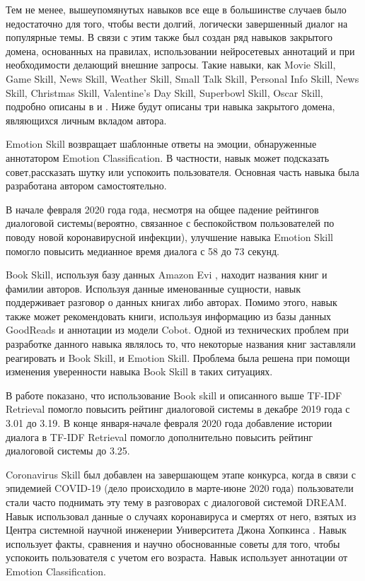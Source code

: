 Тем не менее, вышеупомянутых навыков все еще в большинстве случаев было недостаточно для того, чтобы вести долгий, логически завершенный диалог на популярные темы. В связи с этим также был создан ряд навыков закрытого домена, основанных на правилах, использовании нейросетевых аннотаций и при необходимости делающий внешние запросы. Такие навыки, как Movie Skill, Game Skill, News Skill, Weather Skill, Small Talk Skill, Personal Info Skill, News Skill, Christmas Skill, Valentine’s Day Skill, Superbowl Skill, Oscar Skill, подробно описаны в \cite{dream1} и \cite{dream1_trudy}. Ниже будут описаны три навыка закрытого домена, являющихся личным вкладом автора.

Emotion Skill возвращает шаблонные ответы на эмоции, обнаруженные аннотатором Emotion Classification. В частности, навык может подсказать совет,рассказать шутку или успокоить пользователя. Основная часть навыка была разработана автором самостоятельно.

В начале февраля 2020 года года, несмотря на общее падение рейтингов диалоговой системы(вероятно, связанное  с беспокойством пользователей по поводу новой коронавирусной инфекции), улучшение навыка Emotion Skill помогло повысить медианное время диалога с 58 до 73 секунд.

Book Skill, используя базу данных Amazon Evi \cite{na_website_nds}, находит названия книг и фамилии авторов. Используя данные именованные сущности, навык поддерживает разговор о данных книгах либо авторах. Помимо этого, навык также может рекомендовать книги, используя информацию из базы данных GoodReads \cite{na_website_ndt} и аннотации из модели Cobot. Одной из технических проблем при разработке данного навыка являлось то, что некоторые названия книг заставляли реагировать и Book Skill, и Emotion Skill. Проблема была решена при помощи изменения уверенности навыка Book Skill в таких ситуациях.

В работе \cite{dream1} показано, что использование Book skill и описанного выше TF-IDF Retrieval помогло повысить рейтинг диалоговой системы в декабре 2019 года с 3.01 до 3.19.  В конце января-начале февраля 2020 года добавление истории диалога в TF-IDF Retrieval помогло дополнительно повысить рейтинг диалоговой системы до 3.25. 

Coronavirus Skill был добавлен на завершающем этапе конкурса, когда в связи с эпидемией COVID-19 (дело происходило в марте-июне 2020 года) пользователи стали часто поднимать эту тему в разговорах с диалоговой системой DREAM. Навык использовал данные о случаях коронавируса и смертях от него, взятых из Центра системной научной инженерии Университета Джона Хопкинса \cite{na_website_ndr}. Навык использует факты, сравнения и научно обоснованные советы для того, чтобы успокоить пользователя с учетом его возраста. Навык использует аннотации от Emotion Classification.

